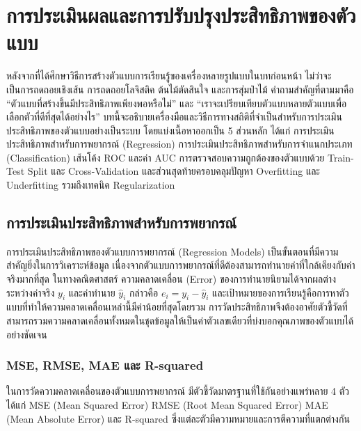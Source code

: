 ﻿\chapter{การประเมินผลและการปรับปรุงประสิทธิภาพของตัวแบบ}
\label{CH7_Evaluation}

หลังจากที่ได้ศึกษาวิธีการสร้างตัวแบบการเรียนรู้ของเครื่องหลายรูปแบบในบทก่อนหน้า ไม่ว่าจะเป็นการถดถอยเชิงเส้น การถดถอยโลจิสติค ต้นไม้ตัดสินใจ และการสุ่มป่าไม้ คำถามสำคัญที่ตามมาคือ ``ตัวแบบที่สร้างขึ้นมีประสิทธิภาพเพียงพอหรือไม่'' และ ``เราจะเปรียบเทียบตัวแบบหลายตัวแบบเพื่อเลือกตัวที่ดีที่สุดได้อย่างไร'' บทนี้จะอธิบายเครื่องมือและวิธีการทางสถิติที่จำเป็นสำหรับการประเมินประสิทธิภาพของตัวแบบอย่างเป็นระบบ โดยแบ่งเนื้อหาออกเป็น 5 ส่วนหลัก ได้แก่ การประเมินประสิทธิภาพสำหรับการพยากรณ์ (Regression) การประเมินประสิทธิภาพสำหรับการจำแนกประเภท (Classification) เส้นโค้ง ROC และค่า AUC การตรวจสอบความถูกต้องของตัวแบบด้วย Train-Test Split และ Cross-Validation และส่วนสุดท้ายครอบคลุมปัญหา Overfitting และ Underfitting รวมถึงเทคนิค Regularization

\section{การประเมินประสิทธิภาพสำหรับการพยากรณ์}
การประเมินประสิทธิภาพของตัวแบบการพยากรณ์ (Regression Models) เป็นขั้นตอนที่มีความสำคัญยิ่งในการวิเคราะห์ข้อมูล เนื่องจากตัวแบบการพยากรณ์ที่ดีต้องสามารถทำนายค่าที่ใกล้เคียงกับค่าจริงมากที่สุด ในทางคณิตศาสตร์ ความคลาดเคลื่อน (Error) ของการทำนายนิยามได้จากผลต่างระหว่างค่าจริง $y_i$ และค่าทำนาย $\hat{y}_i$ กล่าวคือ $e_i = y_i - \hat{y}_i$ และเป้าหมายของการเรียนรู้คือการหาตัวแบบที่ทำให้ความคลาดเคลื่อนเหล่านี้มีค่าน้อยที่สุดโดยรวม การวัดประสิทธิภาพจึงต้องอาศัยตัวชี้วัดที่สามารถรวมความคลาดเคลื่อนทั้งหมดในชุดข้อมูลให้เป็นค่าตัวเลขเดียวที่บ่งบอกคุณภาพของตัวแบบได้อย่างชัดเจน

\subsection{MSE, RMSE, MAE และ R-squared}
ในการวัดความคลาดเคลื่อนของตัวแบบการพยากรณ์ มีตัวชี้วัดมาตรฐานที่ใช้กันอย่างแพร่หลาย 4 ตัว ได้แก่ MSE (Mean Squared Error) RMSE (Root Mean Squared Error) MAE (Mean Absolute Error) และ R-squared ซึ่งแต่ละตัวมีความหมายและการตีความที่แตกต่างกัน

